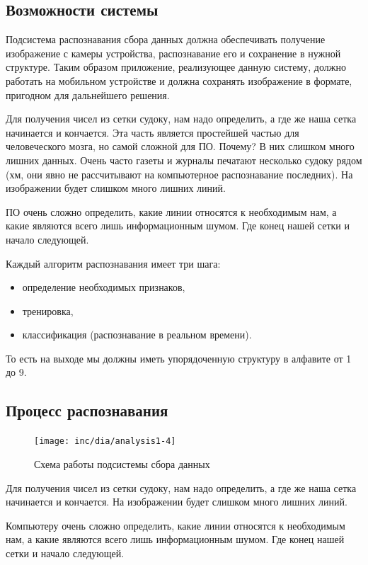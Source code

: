 \subsection{Возможности системы}

Подсистема распознавания сбора данных должна обеспечивать получение изображение с камеры устройства, распознавание его и сохранение в нужной структуре.  Таким образом приложение, реализующее данную систему, должно работать на мобильном устройстве и должна сохранять изображение в формате, пригодном для дальнейшего решения. 

Для получения чисел из сетки судоку, нам надо определить, а где же наша сетка начинается и кончается. Эта часть является простейшей частью для человеческого мозга, но самой сложной для ПО. Почему? В них слишком много лишних данных. Очень часто газеты и журналы печатают несколько судоку рядом (хм, они явно не рассчитывают на компьютерное распознавание последних). На изображении будет слишком много лишних линий. 

ПО очень сложно определить, какие линии относятся к необходимым нам, а какие являются всего лишь информационным шумом. Где конец нашей сетки и начало следующей.

Каждый алгоритм распознавания имеет три шага:
\begin{itemize}
\item определение необходимых признаков,
\item тренировка,
\item классификация (распознавание в реальном времени).
\end{itemize}

То есть на выходе мы должны иметь упорядоченную структуру в алфавите от 1 до 9.

\subsection{Процесс распознавания}
\begin{figure}[ht]
  \centering
  \texttt{[image: inc/dia/analysis1-4]}
  \caption{Схема работы подсистемы сбора данных}
  \label{fig:fig04}
\end{figure}
Для получения чисел из сетки судоку, нам надо определить, а где же наша сетка начинается и кончается.  На изображении будет слишком много лишних линий. 

Компьютеру очень сложно определить, какие линии относятся к необходимым нам, а какие являются всего лишь информационным шумом. Где конец нашей сетки и начало следующей.

